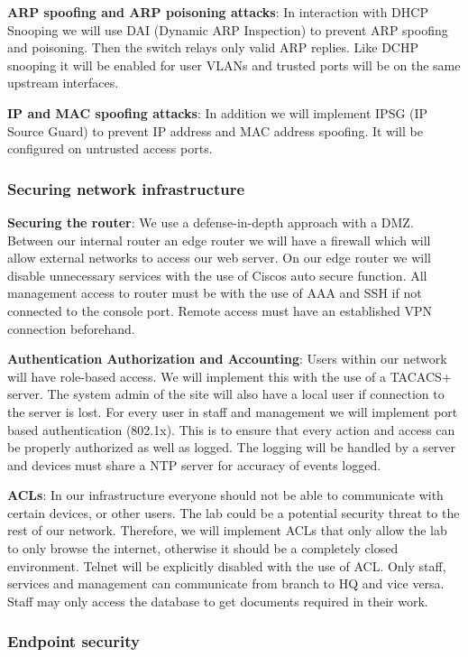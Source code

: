 \textbf{ARP spoofing and ARP poisoning attacks}: In interaction with DHCP Snooping we will use DAI (Dynamic ARP Inspection) to prevent ARP spoofing and poisoning. Then the switch relays only valid ARP replies. Like DCHP snooping it will be enabled for user VLANs and trusted ports will be on the same upstream interfaces. 

\textbf{IP and MAC spoofing attacks}: In addition we will implement IPSG (IP Source Guard) to prevent IP address and MAC address spoofing. It will be configured on untrusted access ports.

\subsubsection{Securing network infrastructure}

\textbf{Securing the router}: We use a defense-in-depth approach with a DMZ. Between our internal router an edge router we will have a firewall which will allow external networks to access our web server. On our edge router we will disable unnecessary services with the use of Ciscos auto secure function. All management access to router must be with the use of AAA and SSH if not connected to the console port. Remote access must have an established VPN connection beforehand.

\textbf{Authentication Authorization and Accounting}: Users within our network will have role-based access. We will implement this with the use of a TACACS+ server. The system admin of the site will also have a local user if connection to the server is lost. For every user in staff and management we will implement port based authentication (802.1x). This is to ensure that every action and access can be properly authorized as well as logged. The logging will be handled by a server and devices must share a NTP server for accuracy of events logged.

\textbf{ACLs}: In our infrastructure everyone should not be able to communicate with certain devices, or other users. The lab could be a potential security threat to the rest of our network. Therefore, we will implement ACLs that only allow the lab to only browse the internet, otherwise it should be a completely closed environment. Telnet will be explicitly disabled with the use of ACL. Only staff, services and management can communicate from branch to HQ and vice versa. Staff may only access the database to get documents required in their work.

\subsubsection{Endpoint security}

